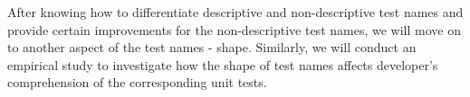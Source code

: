



After knowing how to differentiate descriptive and non-descriptive test names and provide certain improvements for the non-descriptive test names, we will move on to another aspect of the test names - shape.
%
Similarly, we will conduct an empirical study to investigate how the shape of test names affects developer's comprehension of the corresponding unit tests.
